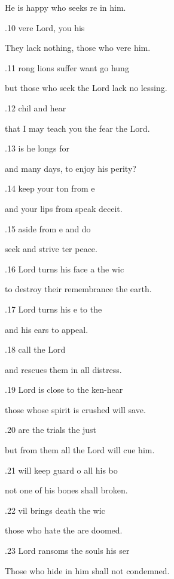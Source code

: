 He is happy who seeks re in him. 

.10 vere  Lord, you his  

They lack nothing, those who vere him. 

.11 rong lions suffer want  go hung 

but those who seek the Lord lack no lessing. 

.12  chil and hear  

that I may teach you the fear  the Lord. 

.13  is he  longs for  

and many days, to enjoy his perity? 

.14  keep your ton from e 

and your lips from speak deceit. 

.15  aside from e and do  

seek and strive ter peace. 

.16  Lord turns his face a the wic 

to destroy their remembrance  the earth. 

.17  Lord turns his e to the  

and his ears to  appeal. 

.18  call  the Lord  

and rescues them in all  distress. 

.19  Lord is close to the ken-hear 

those whose spirit is crushed  will save. 

.20  are the trials  the just  

but from them all the Lord will cue him. 

.21  will keep guard o all his bo 

not one of his bones shall  broken. 

.22 vil brings death  the wic 

those who hate the  are doomed. 

.23  Lord ransoms the souls  his ser 

Those who hide in him shall not  condemned. 

